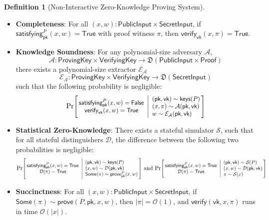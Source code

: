 \documentclass[a4paper]{article}
\theoremstyle{definition}
\newtheorem{definition}{Definition}[subsection]
\renewcommand{\abs}[1]{\left|#1\right|}
\newcommand{\Prob}[2]{\mathrm{Pr}\scalebox{0.88}{\ensuremath{\left[\!\!\begin{array}{c}#1\end{array} \middle| \begin{array}{l}#2\end{array}\!\!\right]}}}
\newcommand{\False}{{\textsf{False}}}
\newcommand{\Proof}{{\textsf{Proof}}}
\newcommand{\ProvingKey}{{\textsf{ProvingKey}}}
\newcommand{\PublicInput}{{\textsf{PublicInput}}}
\newcommand{\SecretInput}{{\textsf{SecretInput}}}
\newcommand{\Some}{{\textsf{Some}}}
\newcommand{\True}{{\textsf{True}}}
\newcommand{\VerifyingKey}{{\textsf{VerifyingKey}}}
\newcommand{\keys}{{\textsf{keys}}}
\newcommand{\pk}{{\textsf{pk}}}
\newcommand{\prove}{{\textsf{prove}}}
\newcommand{\satisfying}{{\textsf{satisfying}}}
\newcommand{\verify}{{\textsf{verify}}}
\newcommand{\vk}{{\textsf{vk}}}
\begin{document}
\begin{definition}[Non-Interactive Zero-Knowledge Proving System]
    \begin{itemize}
        \item \textbf{Completeness}: For all $(x, w) : \PublicInput \times \SecretInput$, if $\satisfying^P_\pk(x, w) = \True$ with proof witness $\pi$, then $\verify_\vk(x, \pi) = \True$.
        \item \textbf{Knowledge Soundness}: For any polynomial-size adversary $\mathcal{A}$,
            \[\mathcal{A} : \ProvingKey \times \VerifyingKey \to \mathfrak{D}(\PublicInput \times \Proof)\]
             there exists a polynomial-size extractor $\mathcal{E}_\mathcal{A}$
            \[\mathcal{E}_\mathcal{A} : \ProvingKey \times \VerifyingKey \to \mathfrak{D}(\SecretInput)\]
            such that the following probability is negligible:
            \[
                \Prob{
                    \satisfying^P_\pk(x, w) = \False \\
                    \verify_\vk(x, w) = \True
                }{
                    (\pk, \vk) \sim \keys(P) \\
                    (x, \pi) \sim \mathcal{A}(\pk, \vk) \\
                    w \sim \mathcal{E}_\mathcal{A}(\pk, \vk)
                }
            \]
        \item \textbf{Statistical Zero-Knowledge}: There exists a stateful simulator $\mathcal{S}$, such that for all stateful distinguishers $\mathcal{D}$, the difference between the following two probabilities is negligible:
            \[
                \Prob{
                    \satisfying^P_\pk(x, w) = \True \\
                    \mathcal{D}(\pi) = \True
                }{
                    (\pk, \vk) \sim \keys(P) \\
                    (x, w) \sim \mathcal{D}(\pk, \vk) \\
                    \Some(\pi) \sim \prove^P_\pk(x, w)
                }
                \,\,\text{and}\,\,
                \Prob{
                    \satisfying^P_\pk(x, w) = \True \\
                    \mathcal{D}(\pi) = \True
                }{
                    (\pk, \vk) \sim \mathcal{S}(P) \\
                    (x, w) \sim \mathcal{D}(\pk, \vk) \\
                    \pi \sim \mathcal{S}(x)
                }
            \]
        \item \textbf{Succinctness}: For all $(x, w) : \PublicInput \times \SecretInput$, if $\Some(\pi) \sim \prove(P, \pk, x, w)$, then $\abs{\pi} = \mathcal{O}(1)$, and $\verify(\vk, x, \pi)$ runs in time $\mathcal{O}(\abs{x})$.
    \end{itemize}
\end{definition}
\end{document}
